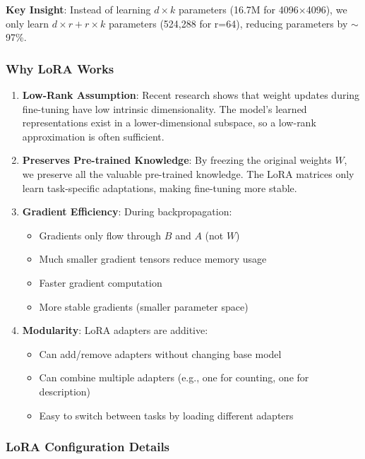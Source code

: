 \documentclass[conference]{IEEEtran}
\begin{document}
\textbf{Key Insight}: Instead of learning $d \times k$ parameters (16.7M for 4096×4096), we only learn $d \times r + r \times k$ parameters (524,288 for r=64), reducing parameters by $\sim$97\%.

\subsubsection{Why LoRA Works}

\begin{enumerate}
    \item \textbf{Low-Rank Assumption}: Recent research shows that weight updates during fine-tuning have low intrinsic dimensionality. The model's learned representations exist in a lower-dimensional subspace, so a low-rank approximation is often sufficient.
    
    \item \textbf{Preserves Pre-trained Knowledge}: By freezing the original weights $W$, we preserve all the valuable pre-trained knowledge. The LoRA matrices only learn task-specific adaptations, making fine-tuning more stable.
    
    \item \textbf{Gradient Efficiency}: During backpropagation:
    \begin{itemize}
        \item Gradients only flow through $B$ and $A$ (not $W$)
        \item Much smaller gradient tensors reduce memory usage
        \item Faster gradient computation
        \item More stable gradients (smaller parameter space)
    \end{itemize}
    
    \item \textbf{Modularity}: LoRA adapters are additive:
    \begin{itemize}
        \item Can add/remove adapters without changing base model
        \item Can combine multiple adapters (e.g., one for counting, one for description)
        \item Easy to switch between tasks by loading different adapters
    \end{itemize}
\end{enumerate}

\subsubsection{LoRA Configuration Details}
\end{document}

